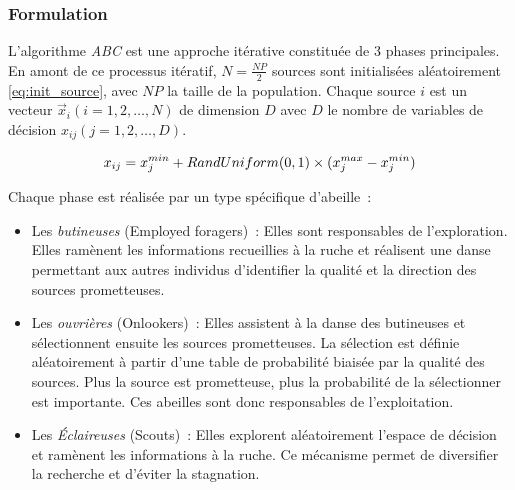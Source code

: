 \subsubsection{Formulation} %
\label{ssub:formulation}
L’algorithme \textit{ABC} est une approche itérative constituée de 3 phases principales.
En amont de ce processus itératif, $N = \frac{NP}{2}$ sources sont initialisées
aléatoirement \eqref{eq:init_source}, avec $NP$ la taille de la population.
Chaque source $i$ est un vecteur $\vec{x}_{i}(i = 1, 2, \dotsc, N)$ de dimension $D$
avec $D$ le nombre de variables de décision $x_{ij} (j = 1, 2, \dotsc, D)$.

\begin{equation}\label{eq:init_source}
  x_{ij} = x_{j}^{min} + RandUniform(0, 1) \times (x_{j}^{max} - x_{j}^{min}) \\
\end{equation}

\noindent Chaque phase est réalisée par un type spécifique d’abeille~:
\begin{itemize}
  \item Les \emph{butineuses} (Employed foragers)~: Elles sont responsables de l’exploration.
        Elles ramènent les informations recueillies à la ruche et réalisent une danse
        permettant aux autres individus d’identifier la qualité et la direction des
        sources prometteuses.
  \item Les \emph{ouvrières} (Onlookers)~: Elles assistent à la danse des butineuses
        et sélectionnent ensuite les sources prometteuses. La sélection est définie
        aléatoirement à partir d’une table de probabilité biaisée par la qualité des sources.
        Plus la source est prometteuse, plus la probabilité de la sélectionner est importante.
        Ces abeilles sont donc responsables de l’exploitation.
  \item Les \emph{Éclaireuses} (Scouts)~: Elles explorent aléatoirement l’espace
        de décision et ramènent les informations à la ruche. Ce mécanisme
        permet de diversifier la recherche et d’éviter la stagnation.
\end{itemize}

